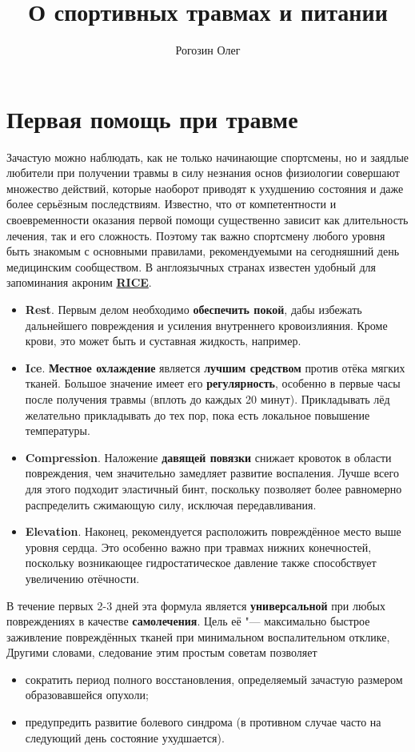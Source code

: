 \documentclass[english,russian,a4paper,12pt]{article}
\title{О спортивных травмах и питании}
\author{Рогозин Олег}
\begin{document}
\maketitle
\tableofcontents

\section{Первая помощь при травме}
Зачастую можно наблюдать, как не только начинающие спортсмены, но и заядлые любители при получении травмы в силу незнания
основ физиологии совершают множество действий, которые наоборот приводят к ухудшению состояния и даже более серьёзным последствиям.
Известно, что от компетентности и своевременности оказания первой помощи существенно зависит как длительность лечения,
так и его сложность. Поэтому так важно спортсмену любого уровня быть знакомым с основными правилами,
рекомендуемыми на сегодняшний день медицинским сообществом.
В англоязычных странах известен удобный для запоминания акроним \href{http://en.wikipedia.org/wiki/RICE_(medicine)}{\textbf{RICE}}.
\begin{itemize}
	\item \textbf{Rest}. Первым делом необходимо \textbf{обеспечить покой}, дабы избежать дальнейшего повреждения и
	усиления внутреннего кровоизлияния. Кроме крови, это может быть и суставная жидкость, например.
	\item \textbf{Ice}. \textbf{Местное охлаждение} является \textbf{лучшим средством} против отёка мягких тканей.
	Большое значение имеет его \textbf{регулярность}, особенно в первые часы после получения травмы (вплоть до каждых 20 минут).
	Прикладывать лёд желательно прикладывать до тех пор, пока есть локальное повышение температуры.
	\item \textbf{Compression}. Наложение \textbf{давящей повязки} снижает кровоток в области повреждения,
	чем значительно замедляет развитие воспаления. Лучше всего для этого подходит эластичный бинт,
	поскольку позволяет более равномерно распределить сжимающую силу, исключая передавливания.
	\item \textbf{Elevation}. Наконец, рекомендуется расположить повреждённое место выше уровня сердца.
	Это особенно важно при травмах нижних конечностей, поскольку возникающее гидростатическое давление
	также способствует увеличению отёчности.
\end{itemize}
В течение первых 2-3 дней эта формула является \textbf{универсальной} при любых повреждениях в качестве \textbf{самолечения}.
Цель её "--- максимально быстрое заживление повреждённых тканей при минимальном воспалительном отклике,
Другими словами, следование этим простым советам позволяет 
\begin{itemize}
	\item сократить период полного восстановления, определяемый зачастую размером образовавшейся опухоли;
	\item предупредить развитие болевого синдрома (в противном случае часто на следующий день состояние ухудшается).
\end{itemize}
\end{document}
